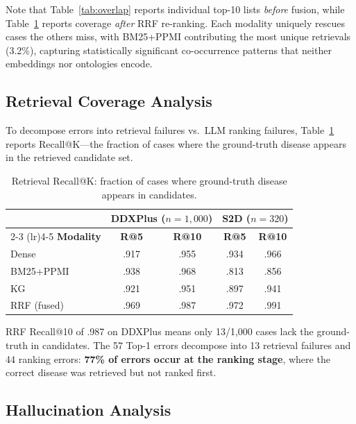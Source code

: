 \documentclass[runningheads]{llncs}
\begin{document}
Note that Table~\ref{tab:overlap} reports individual top-10 lists \emph{before} fusion, while Table~\ref{tab:recall} reports coverage \emph{after} RRF re-ranking. Each modality uniquely rescues cases the others miss, with BM25+PPMI contributing the most unique retrievals (3.2\%), capturing statistically significant co-occurrence patterns that neither embeddings nor ontologies encode.

\subsection{Retrieval Coverage Analysis}
\label{sec:recall}

To decompose errors into retrieval failures vs.\ LLM ranking failures, Table~\ref{tab:recall} reports Recall@K---the fraction of cases where the ground-truth disease appears in the retrieved candidate set.

\begin{table}[t]
\centering
\caption{Retrieval Recall@K: fraction of cases where ground-truth disease appears in candidates.}
\label{tab:recall}
\begin{tabular}{lcccc}
\toprule
& \multicolumn{2}{c}{\textbf{DDXPlus} ($n{=}1{,}000$)} & \multicolumn{2}{c}{\textbf{S2D} ($n{=}320$)} \\
\cmidrule(lr){2-3} \cmidrule(lr){4-5}
\textbf{Modality} & \textbf{R@5} & \textbf{R@10} & \textbf{R@5} & \textbf{R@10} \\
\midrule
Dense       & .917 & .955 & .934 & .966 \\
BM25+PPMI   & .938 & .968 & .813 & .856 \\
KG          & .921 & .951 & .897 & .941 \\
RRF (fused) & .969 & .987 & .972 & .991 \\
\bottomrule
\end{tabular}
\end{table}

RRF Recall@10 of .987 on DDXPlus means only 13/1,000 cases lack the ground-truth in candidates. The 57 Top-1 errors decompose into 13 retrieval failures and 44 ranking errors: \textbf{77\% of errors occur at the ranking stage}, where the correct disease was retrieved but not ranked first.

\subsection{Hallucination Analysis}
\label{sec:hallucination}
\end{document}
